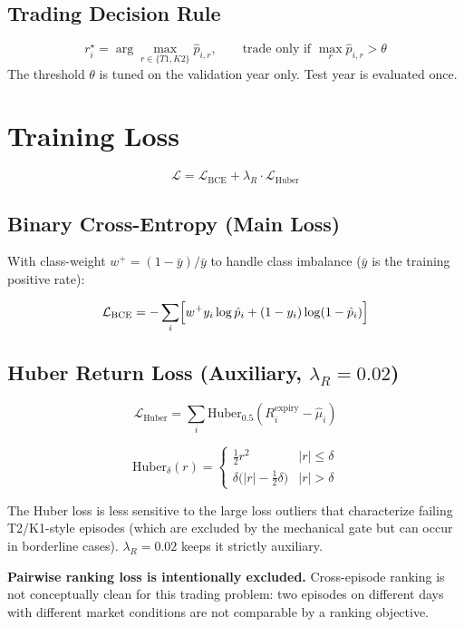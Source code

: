 \documentclass[11pt]{article}
\newcommand{\1}{\mathbf{1}}
\begin{document}
\subsection{Trading Decision Rule}
\[
  r_i^\star
  =
  \arg\max_{r \in \{T1, K2\}} \hat{p}_{i,r},
  \qquad
  \text{trade only if } \max_{r} \hat{p}_{i,r} > \theta
\]
The threshold $\theta$ is tuned on the validation year only. Test year is
evaluated once.

\section{Training Loss}

\[
  \mathcal{L}
  =
  \mathcal{L}_{\mathrm{BCE}}
  +
  \lambda_R \cdot \mathcal{L}_{\mathrm{Huber}}
\]

\subsection{Binary Cross-Entropy (Main Loss)}
With class-weight $w^+ = (1-\bar{y})/\bar{y}$ to handle class imbalance
($\bar{y}$ is the training positive rate):

\[
  \mathcal{L}_{\mathrm{BCE}}
  =
  -\sum_i
  \Bigl[
    w^+ y_i \log \hat{p}_i
    +
    (1 - y_i) \log(1 - \hat{p}_i)
  \Bigr]
\]

\subsection{Huber Return Loss (Auxiliary, $\lambda_R = 0.02$)}
\[
  \mathcal{L}_{\mathrm{Huber}}
  =
  \sum_i \mathrm{Huber}_{0.5}\!\left(R_i^{\mathrm{expiry}} - \hat{\mu}_i\right)
\]

\[
  \mathrm{Huber}_\delta(r)
  =
  \begin{cases}
    \tfrac{1}{2}r^2 & |r| \leq \delta \\
    \delta\bigl(|r| - \tfrac{1}{2}\delta\bigr) & |r| > \delta
  \end{cases}
\]

The Huber loss is less sensitive to the large loss outliers that characterize
failing T2/K1-style episodes (which are excluded by the mechanical gate but
can occur in borderline cases). $\lambda_R = 0.02$ keeps it strictly
auxiliary.

\textbf{Pairwise ranking loss is intentionally excluded.} Cross-episode
ranking is not conceptually clean for this trading problem: two episodes on
different days with different market conditions are not comparable by a
ranking objective.
\end{document}
